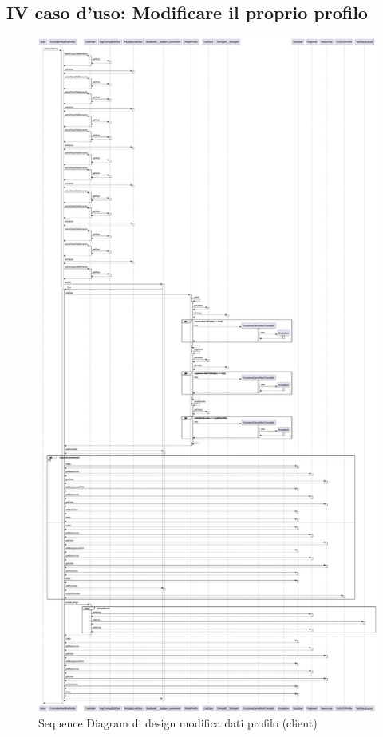         \subsection{IV caso d'uso: Modificare il proprio profilo}
            \begin{figure}[htbp!]
                \centering
                    \includegraphics[width=0.64\linewidth]{Immagini/Diagrammi/Sequence Diagram/Design/Client Sequence Design/ClientSequenceModificaProfiloDesign.pdf}
                \caption{Sequence Diagram di design modifica dati profilo (client)}
                \label{fig:Sequence Diagram di design modifica dati profilo (client)}
            \end{figure}

